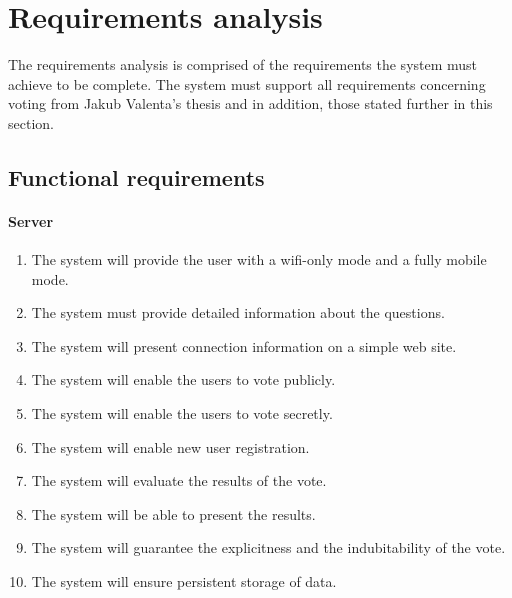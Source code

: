 \documentclass[11pt,twoside,a4paper]{book}
\begin{document}
\section{Requirements analysis}
The requirements analysis is comprised of the requirements the system must achieve to be complete. The system must support all requirements concerning voting from Jakub Valenta's thesis and in addition, those stated further in this section.
\subsection{Functional requirements}
\paragraph*{Server}

\begin{enumerate}

\item  The system will provide the user with a wifi-only mode and a fully mobile mode.
\item  The system must provide detailed information about the questions.
\item  The system will present connection information on a simple web site.
\item  The system will enable the users to vote publicly. \cite{bakalarkaJV}
\item  The system will enable the users to vote secretly. \cite{bakalarkaJV}
\item  The system will enable new user registration. \cite{bakalarkaJV}
\item The system will evaluate the results of the vote.\cite{bakalarkaJV}
\item The system will be able to present the results.\cite{bakalarkaJV}
\item The system will guarantee the explicitness and the indubitability of the vote. \cite{bakalarkaJV}
\item The system will ensure persistent storage of data. \cite{bakalarkaJV}
\end{enumerate}
\end{document}
